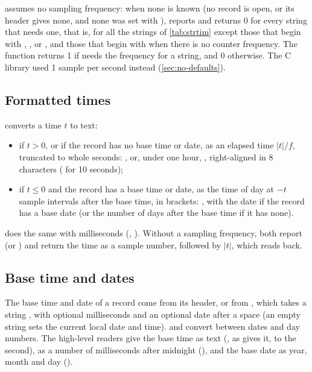 \wfdbx{} assumes no sampling frequency: when none is known (no record is
open, or its header gives none, and none was set with ),
 reports  and
returns 0 for every string that needs one, that is, for all the strings of
\cref{tab:strtim} except those that begin with , ,
 or , and those that begin with  when there is no
counter frequency. The function 
returns 1 if  needs the frequency for a string, and 0
otherwise. The C library used 1 sample per second instead
(\cref{sec:no-defaults}).

\subsection{Formatted times}

 converts a time $t$ to text:
\begin{itemize}
\item if $t > 0$, or if the record has no base time or date, as an elapsed
  time $|t|/f$, truncated to whole seconds: , or, under one
  hour, , right-aligned in 8 characters ( for
  10 seconds);
\item if $t \le 0$ and the record has a base time or date, as the time of
  day at $-t$ sample intervals after the base time, in brackets:
  \code{[hh:mm:ss dd/mm/yyyy]}, with the date if the record has a base date
  (or the number of days after the base time if it has none).
\end{itemize}
 does the same with milliseconds (,
\code{[12:34:56.789 31/12/1999]}). Without a sampling frequency, both report
 (or )
and return the time as a sample number,  followed by $|t|$, which
 reads back.

\subsection{Base time and dates}

The base time and date of a record come from its header, or from
, which takes a string , with optional
milliseconds and an optional date  after a space (an empty
string sets the current local date and time).  and
 convert between dates  and day numbers. The
high-level readers give the base time as text (, as
 gives it, to the second), as a number of milliseconds after
midnight (), and the base date as year, month and day
().

